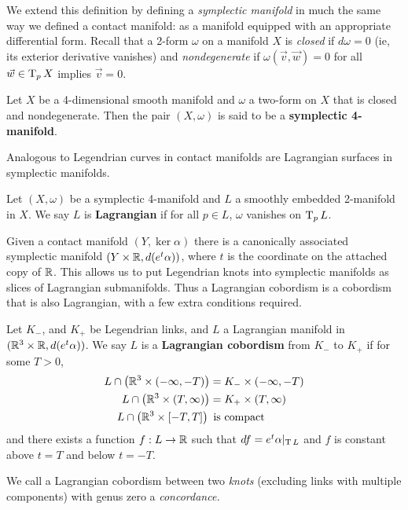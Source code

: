 We extend this definition by defining a \emph{symplectic manifold} in much the same way we defined a contact manifold: as a manifold equipped with an appropriate differential form. Recall that a 2-form $\omega$ on a manifold $X$ is \emph{closed} if $d \omega = 0$ (ie, its exterior derivative vanishes) and \emph{nondegenerate} if $\omega(\vec v, \vec w) = 0$ for all $\vec w \in \operatorname{T}_p X$ implies $\vec v = 0$.

\begin{definition}
    Let $X$ be a 4-dimensional smooth manifold and $\omega$ a two-form on $X$ that is closed and nondegenerate. Then the pair $(X, \omega)$ is said to be a \textbf{symplectic 4-manifold}.
\end{definition}

Analogous to Legendrian curves in contact manifolds are Lagrangian surfaces in symplectic manifolds.
\begin{definition}
    Let $(X, \omega)$ be a symplectic 4-manifold and $L$ a smoothly embedded 2-manifold in $X$. We say $L$ is \textbf{Lagrangian} if for all $p \in L$, $\omega$ vanishes on $\operatorname{T}_p L$.
\end{definition}


Given a contact manifold $(Y, \ker \alpha)$ there is a canonically associated symplectic manifold $(Y \times \mathbb{R}, d(e^t \alpha))$, where $t$ is the coordinate on the attached copy of $\mathbb{R}$. This allows us to put Legendrian knots into symplectic manifolds as slices of Lagrangian submanifolds. Thus a Lagrangian cobordism is a cobordism that is also Lagrangian, with a few extra conditions required.

\begin{definition}
    Let $K_-$, and $K_+$ be Legendrian links, and $L$ a Lagrangian manifold in $(\mathbb{R}^3 \times \mathbb{R}, d(e^t \alpha))$. We say $L$ is a \textbf{Lagrangian cobordism} from $K_-$ to $K_+$ if for some $T > 0$,
    \begin{align*}
        L \cap \left(\mathbb{R}^3 \times (-\infty, -T)\right) &= K_- \times (-\infty, -T)\\
        L \cap \left(\mathbb{R}^3 \times (T, \infty)\right) &= K_+ \times (T, \infty)\\
        L \cap \left(\mathbb{R}^3 \times [-T, T] \right)\, &\,\, \text{is compact}
    \end{align*}
    and there exists a function $f: L \to \mathbb{R}$ such that $df = e^t \alpha |_{\operatorname{T} L}$ and $f$ is constant above $t = T$ and below $t = -T$.

    We call a Lagrangian cobordism between two \emph{knots} (excluding links with multiple components) with genus zero a \emph{concordance.}
\end{definition}

